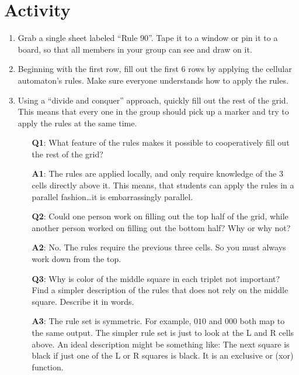 \documentclass{article}
\begin{document}
\section*{Activity}

\begin{enumerate}
	\item Grab a single sheet labeled ``Rule 90''. Tape it to a window or pin
	it to a board, so that all members in your group can see and draw on it.

	\item Beginning with the first row, fill out the first $6$ rows by applying
	the cellular automaton's rules. Make sure everyone understands how to
	apply the rules.

	\item Using a ``divide and conquer'' approach, quickly fill out the rest
	of the grid. This means that every one in the group should pick up a marker
	and try to apply the rules at the same time.

		\begin{itemize}
		\item[\textbf{Q1}:] What feature of the rules makes it possible to cooperatively
		fill out the rest of the grid?

		\item[\textbf{A1}:] The rules are applied locally, and only require knowledge
		of the 3 cells directly above it. This means, that students can apply the
		rules in a parallel fashion\ldots it is embarrassingly parallel.

		\item[\textbf{Q2}:] Could one person work on filling out the top half of the grid,
		while another person worked on filling out the bottom half?
		Why or why not?

		\item[\textbf{A2}:] No. The rules require the previous three cells. So you
		must always work down from the top.

		\item[\textbf{Q3}:] Why is color of the middle square in each triplet
  not important? Find a simpler description of the rules that does not rely on
  the middle square. Describe it in words.

  \item[\textbf{A3}:] The rule set is symmetric. For example, $010$ and $000$
  both map to the same output. The simpler rule set is just to look at the
  L and R cells above. An ideal description might be something like: The next
  square is black if just one of the L or R squares is black. It is an
  exclusive or (xor) function.

		\end{itemize}

\end{enumerate}
\end{document}
